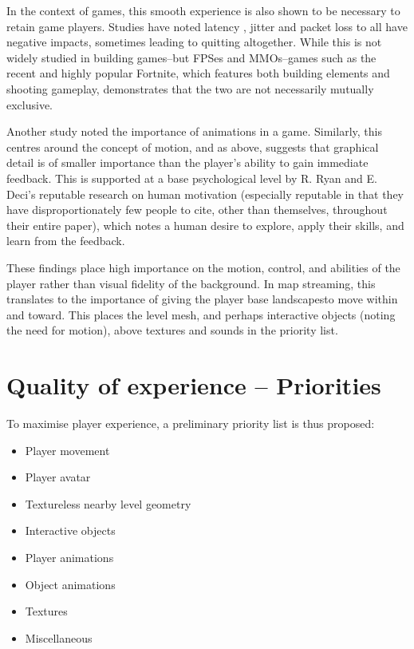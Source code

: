\documentclass{scrartcl}
\begin{document}
In the context of games, this smooth experience is also shown to be necessary to retain game players. Studies have noted latency \cite{qossensitivity} \cite{lagragequits}, jitter and packet loss \cite{lagragequits} to all have negative impacts, sometimes leading to quitting altogether. While this is not widely studied in building games--but FPSes and MMOs--games such as the recent and highly popular \cite{topgames} Fortnite, which features both building elements and shooting gameplay, demonstrates that the two are not necessarily mutually exclusive.

Another study \cite{graphicsvsexperience} noted the importance of animations in a game. Similarly, this centres around the concept of motion, and as above, suggests that graphical detail is of smaller importance than the player's ability to gain immediate feedback. This is supported at a base psychological level by R. Ryan and E. Deci's reputable research on human motivation \cite{motivation} (especially reputable in that they have disproportionately few people to cite, other than themselves, throughout their entire paper), which notes a human desire to explore, apply their skills, and learn from the feedback.

These findings place high importance on the motion, control, and abilities of the player rather than visual fidelity of the background. In map streaming, this translates to the importance of giving the player base landscapesto move within and toward. This places the level mesh, and perhaps interactive objects (noting the need for motion), above textures and sounds in the priority list.

\section{Quality of experience -- Priorities}
To maximise player experience, a preliminary priority list is thus proposed:

\begin{itemize}
	\item Player movement
	\item Player avatar
	\item Textureless nearby level geometry
	\item Interactive objects
	\item Player animations
	\item Object animations
	\item Textures
	\item Miscellaneous
\end{itemize}
\end{document}
